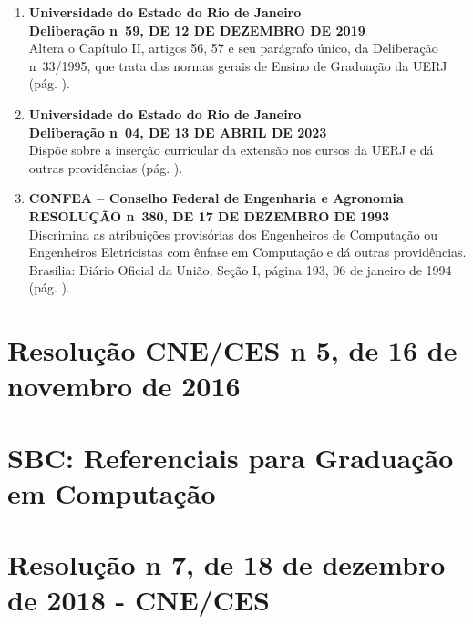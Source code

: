 \documentclass[12pt,a4paper]{article}
\begin{document}
\begin{enumerate}
      \item \textbf{Universidade do Estado do Rio de Janeiro}  \\
            \textbf{Deliberação n\textordmasculine{}~59, DE 12 DE DEZEMBRO DE 2019} \\
            Altera o Capítulo II, artigos 56, 57 e seu parágrafo único, da Deliberação n\textordmasculine{}~33/1995, que trata das normas gerais de Ensino de Graduação da UERJ (pág. \pageref{delib592019}).
      \item \textbf{Universidade do Estado do Rio de Janeiro}  \\
            \textbf{Deliberação n\textordmasculine{}~04, DE 13 DE ABRIL DE 2023}  \\
            Dispõe sobre a inserção curricular da extensão nos cursos da UERJ e dá outras providências (pág. \pageref{del4}).
      \item \textbf{CONFEA – Conselho Federal de Engenharia e Agronomia} \\
            \textbf{RESOLUÇÃO n\textordmasculine{}~380, DE 17 DE DEZEMBRO DE 1993}  \\
            Discrimina as atribuições provisórias dos Engenheiros de Computação ou Engenheiros Eletricistas com ênfase em Computação e dá outras providências. Brasília: Diário Oficial da União, Seção I, página 193, 06 de janeiro de 1994 (pág. \pageref{confea1993}).
\end{enumerate}
\newpage
\pagestyle{empty}
\thispagestyle{empty}
\section{Resolução CNE/CES n\textordmasculine{} 5, de 16 de novembro de 2016}
\label{cne2016}

\section{SBC: Referenciais para Graduação em Computação}
\label{sbc2017}

\section{Resolução n\textordmasculine{} 7, de 18 de dezembro de 2018 - CNE/CES}
\label{rcne2018}

\end{document}
